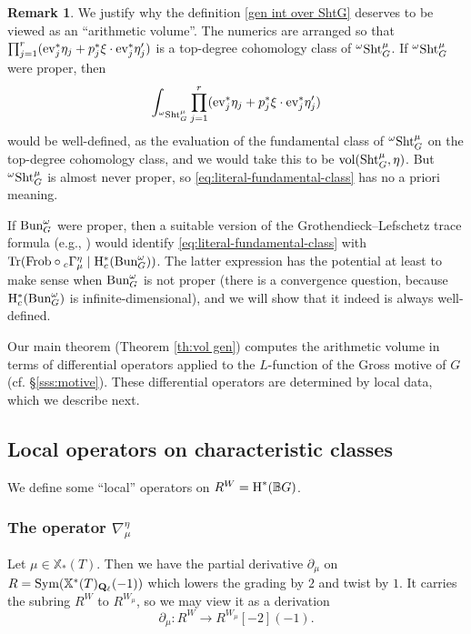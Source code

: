 \documentclass[reqno]{amsart}
\numberwithin{equation}{subsection}
\theoremstyle{definition}
\newtheorem{remark}[subsubsection]{Remark}
\def\BB{\mathbb{B}}
\newcommand{\Bun}{\textup{Bun}}
\newcommand\ev{\textup{ev}}
\newcommand\Frob{\textup{Frob}}
\newcommand\Sht{\textup{Sht}}
\newcommand\Sym{\textup{Sym}}
\newcommand{\Tr}{\textup{Tr}}
\newcommand{\vol}{\textup{vol}}
\newcommand\xch{\mathbb{X}^*}
\newcommand\xcoch{\mathbb{X}_*}
\newcommand{\Ql}{\Q_{\ell}}
\newcommand{\cohog}[2]{\textup{H}^{#1}({#2})}     %
\newcommand{\y}{\eta}
\newcommand{\om}{\omega}
\newcommand\nb{\nabla}
\newcommand\pl{\partial}
\newcommand{\Q}{\mathbf{Q}}
\newcommand{\rH}{\ensuremath{\mathrm{H}}\xspace}
\begin{document}
\begin{remark}
We justify why the definition \eqref{gen int over ShtG} deserves to be viewed as an ``arithmetic volume''. The numerics are arranged so that $\prod_{j=1}^{r}(\ev_{j}^{*}\y_{j}+p_{j}^{*}\xi\cdot \ev_{j}^{*}\y'_{j})$ is a top-degree cohomology class of ${}^\omega\Sht^{\mu}_{G}$. If ${}^\omega\Sht^{\mu}_G$ were proper, then 
\begin{equation}\label{eq:literal-fundamental-class}
\int_{{}^{\om}\Sht^{\mu}_{G}}\prod_{j=1}^{r}(\ev_{j}^{*}\y_{j}+p_{j}^{*}\xi\cdot \ev_{j}^{*}\y'_{j}) 
\end{equation}
would be well-defined, as the evaluation of the fundamental class of ${}^\omega\Sht^{\mu}_G$ on the top-degree cohomology class, and we would take this to be $\vol(\Sht_G^\mu, \eta)$. But ${}^\omega\Sht^{\mu}_G$ is almost never proper, so \eqref{eq:literal-fundamental-class} has no a priori meaning.

 If $\Bun_G^\omega$ were proper, then a suitable version of the Grothendieck--Lefschetz trace formula (e.g., \cite[Proposition 11.8]{FYZ}) would identify \eqref{eq:literal-fundamental-class} with $\Tr(\Frob\circ
{}_{c}\Gamma^{ \eta}_{ \mu}  \mid \rH_c^*(\Bun_G^\omega))$. The latter expression has the potential at least to make sense when $\Bun_G^\omega$ is not proper (there is a convergence question, because $\rH_c^*(\Bun_G^\omega)$ is infinite-dimensional), and we will show that it indeed is always well-defined. 
\end{remark}

Our main theorem (Theorem \ref{th:vol gen}) computes the arithmetic volume in terms of differential operators applied to the $L$-function of the Gross motive of $G$ (cf. \S\ref{sss:motive}). These differential operators are determined by local data, which we describe next. 






\subsection{Local operators on characteristic classes}\label{ssec:nabla-operator} We define some ``local'' operators on $R^W = \cohog{*}{\BB G}$. 

\subsubsection{The operator $\nb^{\y}_{\mu}$}\label{sssec:nabla-operator}
Let $\mu \in \xcoch(T)$. Then we have the partial derivative $\pl_\mu$ on $R = \Sym(\xch(T)_{\Ql}(-1))$ which lowers the grading by $2$ and twist by $1$. It carries the subring $R^W$ to $R^{W_{\mu}}$, so we may view it as a derivation 
\begin{equation*}
\pl_{\mu}: R^{W}\to R^{W_{\mu}}[-2](-1).
\end{equation*}
\end{document}
